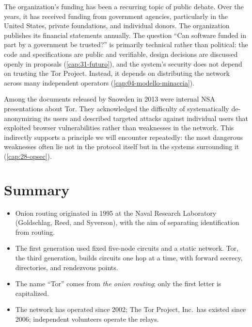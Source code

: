 The organization's funding has been a recurring topic of public debate. Over the years, it has received funding from government agencies, particularly in the United States, private foundations, and individual donors. The organization publishes its financial statements annually. The question \enquote{Can software funded in part by a government be trusted?} is primarily technical rather than political: the code and specifications are public and verifiable, design decisions are discussed openly in proposals (\cref{cap:31-futuro}), and the system's security does not depend on trusting the Tor Project. Instead, it depends on distributing the network across many independent operators (\cref{cap:04-modello-minaccia}).

\begin{approfondimento}
Among the documents released by Snowden in 2013 were internal NSA presentations about Tor. They acknowledged the difficulty of systematically de-anonymizing its users and described targeted attacks against individual users that exploited browser vulnerabilities rather than weaknesses in the network. This indirectly supports a principle we will encounter repeatedly: the most dangerous weaknesses often lie not in the protocol itself but in the systems surrounding it (\cref{cap:28-opsec}).
\end{approfondimento}

\section*{Summary}
\begin{itemize}
  \item Onion routing originated in 1995 at the Naval Research Laboratory (Goldschlag, Reed, and Syverson), with the aim of separating identification from routing.
  \item The first generation used fixed five-node circuits and a static network. Tor, the third generation, builds circuits one hop at a time, with forward secrecy, directories, and rendezvous points.
  \item The name \enquote{Tor} comes from \emph{the onion routing}; only the first letter is capitalized.
  \item The network has operated since 2002; The Tor Project, Inc.\ has existed since 2006; independent volunteers operate the relays.
\end{itemize}

